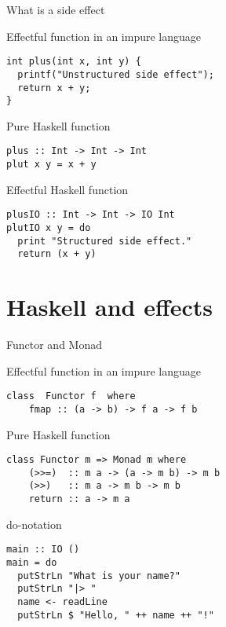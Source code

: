 \begin{frame}[fragile]{What is a side effect}
  \begin{block}{Effectful function in an impure language}
  \begin{verbatim}
int plus(int x, int y) {
  printf("Unstructured side effect");
  return x + y;
}
  \end{verbatim}
  \end{block}
  \begin{block}{Pure Haskell function}
  \begin{verbatim}
plus :: Int -> Int -> Int
plut x y = x + y
  \end{verbatim}
  \end{block}
  \begin{block}{Effectful Haskell function}
  \begin{verbatim}
plusIO :: Int -> Int -> IO Int
plutIO x y = do
  print "Structured side effect."
  return (x + y)
  \end{verbatim}
  \end{block}
\end{frame}

\section{Haskell and effects}

\begin{frame}[fragile]{Functor and Monad}
  \begin{block}{Effectful function in an impure language}
  \begin{verbatim}
class  Functor f  where
    fmap :: (a -> b) -> f a -> f b
  \end{verbatim}
  \end{block}
  \begin{block}{Pure Haskell function}
  \begin{verbatim}
class Functor m => Monad m where
    (>>=)  :: m a -> (a -> m b) -> m b
    (>>)   :: m a -> m b -> m b
    return :: a -> m a
  \end{verbatim}
  \end{block}
\end{frame}

\begin{frame}[fragile]{do-notation}
  \begin{block}{}
  \begin{verbatim}
main :: IO ()
main = do
  putStrLn "What is your name?"
  putStrLn "|> "
  name <- readLine
  putStrLn $ "Hello, " ++ name ++ "!"
  \end{verbatim}
  \end{block}
\end{frame}

